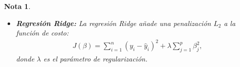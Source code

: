 \documentclass[12pt]{article}
\newtheorem{Note}{Nota}%
\begin{document}
\begin{Note}
\begin{itemize}
\begin{itemize}
\begin{eqnarray*}
J(\beta) = \sum_{i=1}^{n} (y_i - \hat{y}_i)^2 + \lambda \sum_{j=1}^{p} |\beta_j|,
\end{eqnarray*}
donde $\lambda$ es el par\'ametro de regularizaci\'on que controla la cantidad de penalizaci\'on.

\item \textbf{Regresi\'on Ridge:} La regresi\'on Ridge a\~nade una penalizaci\'on $L_2$ a la funci\'on de costo:
\begin{eqnarray*}
J(\beta) = \sum_{i=1}^{n} (y_i - \hat{y}_i)^2 + \lambda \sum_{j=1}^{p} \beta_j^2,
\end{eqnarray*}
donde $\lambda$ es el par\'ametro de regularizaci\'on.
\end{itemize}
\end{itemize}
\end{Note}
\end{document}
